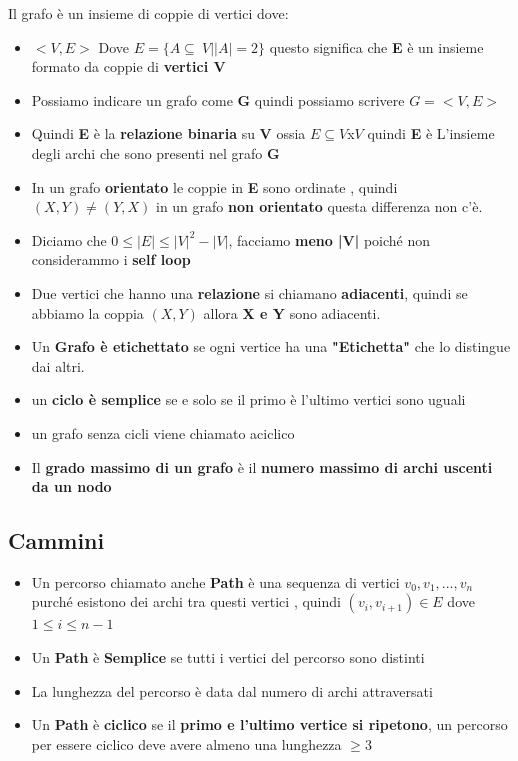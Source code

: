Il grafo è un insieme di coppie di vertici dove:
\begin{itemize}
    \item $<V,E>$ Dove $E = \{A  \subseteq\ V | |A| = 2\}$  questo significa che \textbf{E} è un insieme formato da coppie di \textbf{vertici V}
    \item Possiamo indicare un grafo come \textbf{G} quindi possiamo scrivere $G = <V,E>$
    \item Quindi \textbf{E} è la \textbf{relazione binaria} su \textbf{V} ossia $E \subseteq V$x$V$ quindi \textbf{E} è L'insieme degli archi che sono presenti nel grafo \textbf{G}
    \item In un grafo \textbf{orientato} le coppie in \textbf{E} sono ordinate , quindi $(X,Y) \neq (Y,X)$ in un grafo \textbf{non orientato} questa differenza non c'è. 
    \item Diciamo che $0 \leq |E| \leq |V|^2 - |V|$, facciamo \textbf{meno |V|} poiché non considerammo i \textbf{self loop}
    \item Due vertici che hanno una \textbf{relazione} si chiamano \textbf{adiacenti}, quindi se abbiamo la coppia $(X,Y)$ allora \textbf{X e Y} sono adiacenti.
    \item Un \textbf{Grafo è etichettato} se ogni vertice ha una \textbf{"Etichetta"} che lo distingue dai altri.
    \item un \textbf{ciclo è semplice} se e solo se il primo è l'ultimo vertici sono uguali
    \item un grafo senza cicli viene chiamato aciclico 
    \item Il \textbf{grado massimo di un grafo} è il \textbf{numero massimo di archi uscenti da un nodo}
\end{itemize}
\subsection{Cammini}
\begin{itemize}
    \item Un percorso chiamato anche \textbf{Path} è una sequenza di vertici $v_0,v_1,...,v_n$ purché esistono dei archi tra questi vertici , quindi $(v_i,v_{i+1}) \in E$ dove $1 \leq i \leq n-1$
    \item Un \textbf{Path} è \textbf{Semplice} se tutti i vertici del percorso sono distinti
    \item La lunghezza del percorso è data dal numero di archi attraversati
    \item Un \textbf{Path} è \textbf{ciclico} se il \textbf{primo e l'ultimo vertice si ripetono}, un percorso per essere ciclico deve avere almeno una lunghezza $\geq 3$
\end{itemize}

